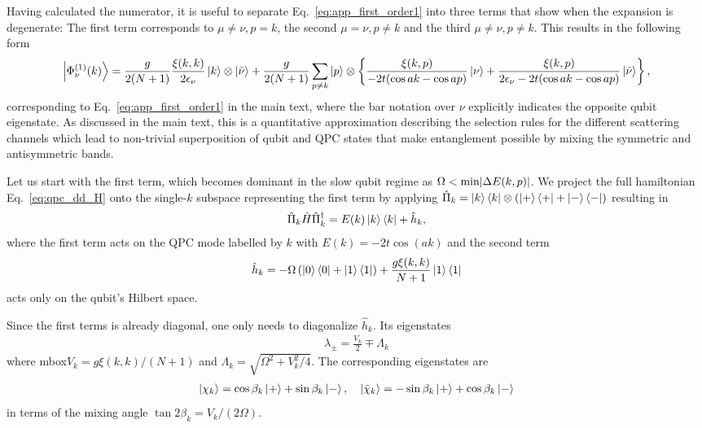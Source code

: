 \documentclass[10pt,
 amsmath,amssymb,
 aps,prb, twocolumn
]{revtex4-2}
\begin{document}
Having calculated the numerator, it is useful to separate Eq.~\eqref{eq:app_first_order1} into three terms that show when the expansion is degenerate: The first term corresponds to \mbox{$\mu \neq \nu, p=k$}, the second \mbox{$\mu = \nu, p\neq k$} and the third \mbox{$\mu \neq \nu, p\neq k$}. This results in the following form
\begin{equation}
     \ket{\Phi_\nu^{(1)} (k)} = \frac{g}{2(N+1)} \frac{\xi(k,k)}{2\epsilon_\nu} \ket{k} \otimes \ket{\bar{\nu}}
    +\frac{g}{2(N+1)} \sum_{p \neq k} \ket{p} \otimes \left\{\frac{\xi(k,p)}{-2t(\cos ak - \cos ap)} \ket{\nu} + \frac{\xi(k,p)}{2\epsilon_\nu - 2t(\cos ak - \cos ap)} \ket{\bar{\nu}} \right\}  \label{eq:app_first_order2},
\end{equation}
corresponding to Eq.~\eqref{eq:app_first_order1} in the main text, where the bar notation over $\nu$ explicitly indicates the opposite qubit eigenstate. As discussed in the main text, this is a quantitative approximation describing the selection rules for the different scattering channels which lead to non-trivial superposition of qubit and QPC states that make entanglement possible by mixing the symmetric and antisymmetric bands. 

Let us start with the first term, which becomes dominant in the slow qubit regime as \mbox{$\Omega < \text{min}\abs{\Delta E (k,p)}$}. We project the full hamiltonian Eq.~\eqref{eq:qpc_dd_H} onto the single-$k$ subspace representing the first term by applying \mbox{$\hat{\Pi}_k = \ket{k}\bra{k}\otimes \left(\ket{+}\bra{+}+\ket{-}\bra{-}\right)$} resulting in
\begin{align}
    \hat{\Pi}_k \hat{H} \hat{\Pi}_k^{\dagger} = E(k) \ket{k}\bra{k} + \hat{h}_k,
\end{align}
where the first term acts on the QPC mode labelled by $k$ with \mbox{$E(k) = - 2t \cos(ak)$} and the second term 
\begin{align}
    \hat{h}_k = - \Omega \left(\ket{0}\bra{0}+\ket{1}\bra{1}\right) + \frac{g \xi(k,k) }{N+1}\ket{1}\bra{1}
\end{align}
acts only on the qubit's Hilbert space.

Since the first terms is already diagonal, one only needs to diagonalize \mbox{$\hat{h}_k$}. Its eigenstates
\begin{align}
    \lambda_\pm = \frac{V_k}{2} \mp \Lambda_k
\end{align}
where mbox{$V_k = g\xi(k,k)/(N+1)$} and \mbox{$\Lambda_k = \sqrt{\Omega^2 + V_k^2/4}$}. The corresponding eigenstates are 
\begin{align}
    \ket{\chi_k} = \cos{\beta_k}\ket{+} + \sin{\beta_k}\ket{-}, \quad \ket{\bar{\chi}_k} = -\sin{\beta_k}\ket{+} + \cos{\beta_k}\ket{-}
\end{align}
in terms of the mixing angle \mbox{$\tan{2\beta_k} = V_k/(2\Omega)$}. 
\end{document}
